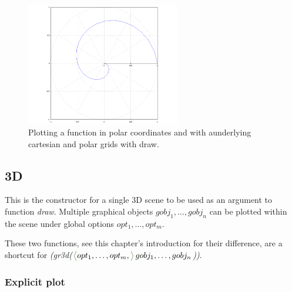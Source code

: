 \documentclass[../Maxima_Workbook.tex]{subfiles}
\begin{document}
\begin{figure}
	\centering
	\includegraphics[width=0.6\textwidth]{Pl_draw_polar_double_grid.png}
	\caption{Plotting a function in polar coordinates and with aunderlying cartesian and polar grids with draw.}
	\label{Pl-Fig13}
\end{figure}

\subsection{3D}

\lz {} \hfill {}

\lz This is the constructor for a single 3D scene to be used as an argument to function \emph{draw}. Multiple graphical objects $ gobj_1,\dots,gobj_n $ can be plotted within the scene under global options $ opt_1,\dots,opt_m $.

\lzz {} \hfill \tcr{[function]}

 \hfill \tcr{[function]}

\lz These two functions, see this chapter's introduction for their difference, are a shortcut for \emph{(gr3d($ \glangle opt_1,\dots,opt_m, \grangle \, gobj_1,\dots,gobj_n $))}.

\subsubsection{Explicit plot}

\lz {}\hfill {}
\end{document}
